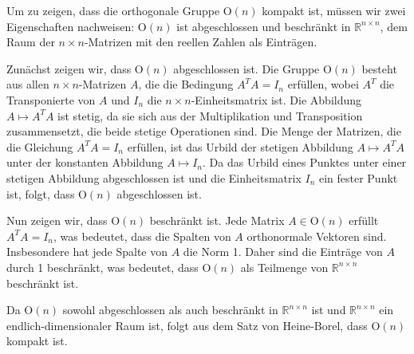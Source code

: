 Um zu zeigen, dass die orthogonale Gruppe $\mathrm{O}(n)$ kompakt ist, müssen wir zwei Eigenschaften nachweisen: $\mathrm{O}(n)$ ist abgeschlossen und beschränkt in $\mathbb{R}^{n \times n}$, dem Raum der $n \times n$-Matrizen mit den reellen Zahlen als Einträgen.

Zunächst zeigen wir, dass $\mathrm{O}(n)$ abgeschlossen ist. Die Gruppe $\mathrm{O}(n)$ besteht aus allen $n \times n$-Matrizen $A$, die die Bedingung $A^T A = I_n$ erfüllen, wobei $A^T$ die Transponierte von $A$ und $I_n$ die $n \times n$-Einheitsmatrix ist. Die Abbildung $A \mapsto A^T A$ ist stetig, da sie sich aus der Multiplikation und Transposition zusammensetzt, die beide stetige Operationen sind. Die Menge der Matrizen, die die Gleichung $A^T A = I_n$ erfüllen, ist das Urbild der stetigen Abbildung $A \mapsto A^T A$ unter der konstanten Abbildung $A \mapsto I_n$. Da das Urbild eines Punktes unter einer stetigen Abbildung abgeschlossen ist und die Einheitsmatrix $I_n$ ein fester Punkt ist, folgt, dass $\mathrm{O}(n)$ abgeschlossen ist.

Nun zeigen wir, dass $\mathrm{O}(n)$ beschränkt ist. Jede Matrix $A \in \mathrm{O}(n)$ erfüllt $A^T A = I_n$, was bedeutet, dass die Spalten von $A$ orthonormale Vektoren sind. Insbesondere hat jede Spalte von $A$ die Norm 1. Daher sind die Einträge von $A$ durch 1 beschränkt, was bedeutet, dass $\mathrm{O}(n)$ als Teilmenge von $\mathbb{R}^{n \times n}$ beschränkt ist.

Da $\mathrm{O}(n)$ sowohl abgeschlossen als auch beschränkt in $\mathbb{R}^{n \times n}$ ist und $\mathbb{R}^{n \times n}$ ein endlich-dimensionaler Raum ist, folgt aus dem Satz von Heine-Borel, dass $\mathrm{O}(n)$ kompakt ist.